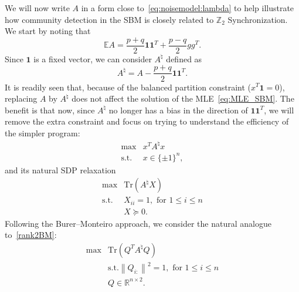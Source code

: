 \documentclass{colt2016} %
\newcommand{\trace}{\mathrm{Tr}}
\newcommand{\1}{\mathbf{1}}
\newcommand{\ZZ}{\mathbb{Z}}
\newcommand{\RR}{\mathbb{R}}
\newcommand{\EE}{\mathbb{E}}
\begin{document}


We will now write $A$ in a form close to~\eqref{eq:noisemodel:lambda} to help illustrate how community detection in the SBM is closely related to $\ZZ_2$ Synchronization. We start by noting that 
\[
\EE A = \frac{p+q}2\1\1^T + \frac{p-q}2gg^T.
\]
Since $\1$ is a fixed vector, we can consider $A^\natural$ defined as
\[
A^\natural = A - \frac{p+q}2\1\1^T.
\]
It is readily seen that, because of the balanced partition constraint ($x^T\1=0$), replacing $A$ by $A^\natural$ does not affect the solution of the MLE~\eqref{eq:MLE_SBM}. The benefit is that now, since $A^\natural$ no longer has a bias in the direction of $\1\1^T$, we will remove the extra constraint and focus on trying to understand the efficiency of the simpler program:
\begin{equation}\label{eq:MLE_SBM_nobalancing}
\begin{array}{ll}
\max & x^T A^\natural x \\
\text{s.t.} & x \in \{\pm1\}^n,
\end{array}
\end{equation}
and its natural SDP relaxation
\begin{equation}\label{SDP:fullrank_SBM}
\begin{array}{ll}
\max & \trace\left( A^\natural X \right) \\
\text{s.t.} & X_{ii} = 1, \text{ for } 1\leq i \leq n\\ 
 & X \succeq 0.
\end{array}
\end{equation}
Following the Burer--Monteiro approach, we consider the natural analogue to~\eqref{rank2BM}:
\begin{equation}\label{rank2BM_SBM}
\begin{array}{ll}
\max & \trace\left( Q^TA^\natural Q \right) \\
 & \text{s.t.} \left\|Q_{i:}\right\|^2 = 1, \text{ for } 1\leq i \leq n \\
 & Q \in \RR^{n \times 2}. 
\end{array}
\end{equation}
\end{document}
